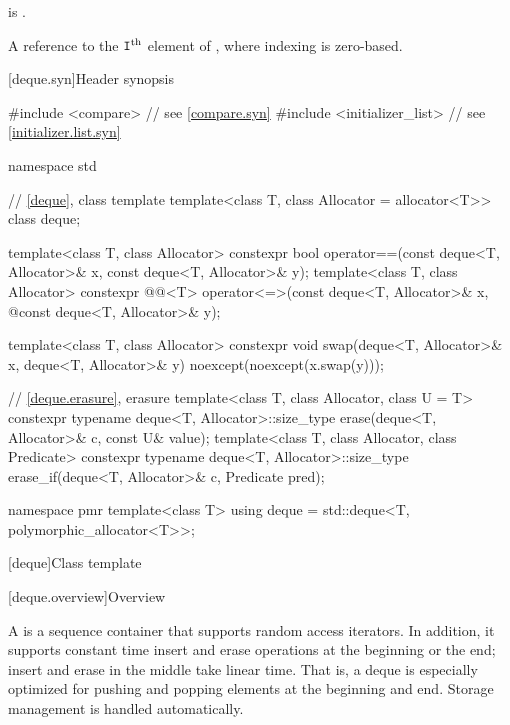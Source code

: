 \begin{itemdescr}
\pnum
\mandates
{} is .

\pnum
\returns
A reference to the $\texttt{\protect I}^\text{th}$ element of ,
where indexing is zero-based.
\end{itemdescr}

[deque.syn]{Header  synopsis}

%
\begin{codeblock}
#include <compare>              // see \ref{compare.syn}
#include <initializer_list>     // see \ref{initializer.list.syn}

namespace std {
  // \ref{deque}, class template 
  template<class T, class Allocator = allocator<T>> class deque;

  template<class T, class Allocator>
    constexpr bool operator==(const deque<T, Allocator>& x, const deque<T, Allocator>& y);
  template<class T, class Allocator>
    constexpr @@<T> operator<=>(const deque<T, Allocator>& x,
    @\itcorr@                                      const deque<T, Allocator>& y);

  template<class T, class Allocator>
    constexpr void swap(deque<T, Allocator>& x, deque<T, Allocator>& y)
      noexcept(noexcept(x.swap(y)));

  // \ref{deque.erasure}, erasure
  template<class T, class Allocator, class U = T>
    constexpr typename deque<T, Allocator>::size_type
      erase(deque<T, Allocator>& c, const U& value);
  template<class T, class Allocator, class Predicate>
    constexpr typename deque<T, Allocator>::size_type
      erase_if(deque<T, Allocator>& c, Predicate pred);

  namespace pmr {
    template<class T>
      using deque = std::deque<T, polymorphic_allocator<T>>;
  }
}
\end{codeblock}

[deque]{Class template }

[deque.overview]{Overview}

\pnum
A
%
is a sequence container that supports random access iterators.
In addition, it supports constant time insert and erase operations at the beginning or the end;
insert and erase in the middle take linear time.
That is, a deque is especially optimized for pushing and popping elements at the beginning and end.
Storage management is handled automatically.

